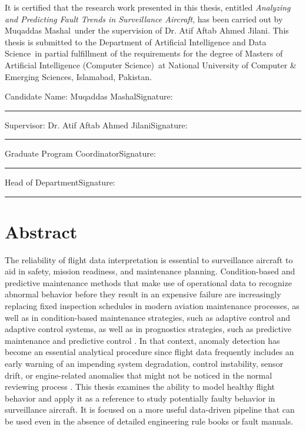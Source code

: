 \documentclass[12pt,a4paper]{report}
\newcommand{\ProjectTitle}{Analyzing and Predicting Fault Trends in Surveillance Aircraft}
\newcommand{\StudentName}{Muqaddas Mashal}
\newcommand{\SupervisorName}{Dr. Atif Aftab Ahmed Jilani}
\newcommand{\DegreeProgram}{Masters of Artificial Intelligence (Computer Science)}
\newcommand{\UniversityName}{National University of Computer \& Emerging Sciences}
\newcommand{\DepartmentName}{Department of Artificial Intelligence and Data Science}
\newcommand{\CampusName}{Islamabad, Pakistan}
\begin{document}
	It is certified that the research work presented in this thesis, entitled \emph{\ProjectTitle}, has been carried out by \StudentName\ under the supervision of \SupervisorName. This thesis is submitted to the \DepartmentName\ in partial fulfillment of the requirements for the degree of \DegreeProgram\ at \UniversityName, \CampusName.
	
	\vspace{0.8cm}
	\noindent Candidate Name: \StudentName\hfill Signature: \rule{2in}{0.4pt}
	
	\vspace{1.0cm}
	\noindent Supervisor: \SupervisorName\hfill Signature: \rule{2in}{0.4pt}
	
	\vspace{1.5cm}
	\noindent Graduate Program Coordinator\hfill Signature: \rule{2in}{0.4pt}
	
	\vspace{0.8cm}
	\noindent Head of Department\hfill Signature: \rule{2in}{0.4pt}
	
	\chapter*{Abstract}
	
	The reliability of flight data interpretation is essential to surveillance aircraft to aid in safety, mission readiness, and maintenance planning. Condition-based and predictive maintenance methods that make use of operational data to recognize abnormal behavior before they result in an expensive failure are increasingly replacing fixed inspection schedules in modern aviation maintenance processes, as well as in condition-based maintenance strategies, such as adaptive control and adaptive control systems, as well as in prognostics strategies, such as predictive maintenance and predictive control \cite{scott2022defence}. In that context, anomaly detection has become an essential analytical procedure since flight data frequently includes an early warning of an impending system degradation, control instability, sensor drift, or engine-related anomalies that might not be noticed in the normal reviewing process \cite{chandola2009survey,basora2019aviation,nassif2021systematic}. This thesis examines the ability to model healthy flight behavior and apply it as a reference to study potentially faulty behavior in surveillance aircraft. It is focused on a more useful data-driven pipeline that can be used even in the absence of detailed engineering rule books or fault manuals.
	
\end{document}
